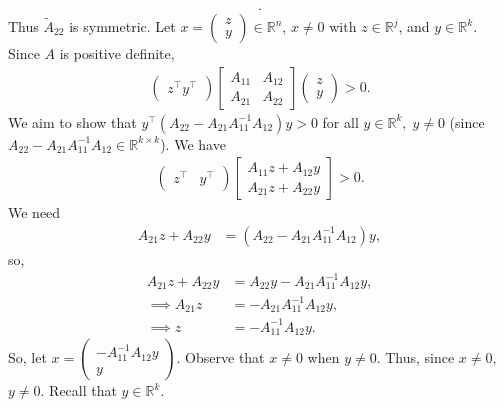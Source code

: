 \documentclass{report}
\begin{document}
\begin{remark}
\begin{align*}
    .\end{align*}
    Thus $\tilde{A}_{22}$ is symmetric.
    \bigbreak \noindent 
    Let $x = \begin{pmatrix} z \\ y \end{pmatrix} \in \mathbb{R}^{n}$, $x \ne 0$ with $z \in \mathbb{R}^{j}$, and $y \in \mathbb{R}^{k}$. Since $A$ is positive definite,
    \begin{align*}
        \begin{pmatrix} z^{\top} y^{\top} \end{pmatrix} \begin{bmatrix}
        A_{11} & A_{12} \\
        A_{21} & A_{22}
        \end{bmatrix}
        \begin{pmatrix} z \\ y \end{pmatrix} > 0
    .\end{align*}
    We aim to show that $y^{\top}(A_{22} - A_{21}A_{11}^{-1}A_{12})y >0 $ for all $y \in \mathbb{R}^{k},\; y\ne 0$ (since $A_{22} - A_{21}A_{11}^{-1}A_{12} \in \mathbb{R}^{k\times k} $). 
    \bigbreak \noindent 
    We have
    \begin{align*}
        \begin{pmatrix} z^{\top} & y^{\top} \end{pmatrix} \begin{bmatrix} A_{11}z + A_{12}y \\ A_{21}z + A_{22}y \end{bmatrix} > 0
    .\end{align*}
    We need 
    \begin{align*}
        A_{21}z + A_{22}y  &= (A_{22} - A_{21}A_{11}^{-1}A_{12})y,
    \end{align*}
    so,
    \begin{align*}
        A_{21}z + A_{22} y &= A_{22}y - A_{21}A_{11}^{-1}A_{12}y,\\
        \implies A_{21}z &= -A_{21}A_{11}^{-1}A_{12}y, \\
        \implies z  &= -A_{11}^{-1}A_{12}y
    .\end{align*}
    So, let $x = \begin{pmatrix} -A_{11}^{-1}A_{12}y \\ y \end{pmatrix} $. Observe that $x \ne 0$ when $y\ne 0$. Thus, since $x \ne 0$, $y\ne 0$. Recall that $y \in \mathbb{R}^{k} $.
    \bigbreak \noindent 

\end{remark}
\end{document}
